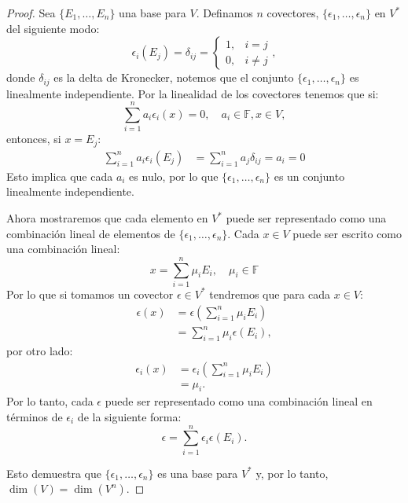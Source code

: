 \begin{proof}
	Sea $\{E_1, \dots, E_n\}$ una base para $V$. Definamos $n$ covectores, $\{\epsilon_1, \dots, \epsilon_n\}$ en $V^{*}$ del siguiente modo:
	\[
		\epsilon_i(E_j) = \delta_{ij} = \begin{cases}
			1, & i = j    \\
			0, & i \neq j
		\end{cases},
	\]
	donde $\delta_{ij}$ es la delta de Kronecker, notemos que el conjunto $\{\epsilon_1, \dots, \epsilon_n\}$ es linealmente independiente. Por la linealidad de los covectores tenemos que si:
	\[
		\sum_{i=1}^{n} a_i \epsilon_i(x) = 0, \quad a_{i} \in \mathbb{F}, x \in V,
	\]
	entonces, si $x = E_j$:
	\begin{align*}
		\sum_{i=1}^n a_i \epsilon_i (E_j) & = \sum_{i=1}^n a_j \delta_{ij} = a_i = 0
	\end{align*}
	Esto implica que cada $a_i$ es nulo, por lo que $\{\epsilon_1, \dots, \epsilon_n\}$ es un conjunto linealmente independiente.

	Ahora mostraremos que cada elemento en $V^{*}$ puede ser representado como una combinación lineal de elementos de $\{\epsilon_1, \dots, \epsilon_n\}$. Cada $x \in V$ puede ser escrito como una combinación lineal:
	\[
		x = \sum_{i=1}^{n} \mu_{i} E_i, \quad \mu_i \in \mathbb{F}
	\]
	Por lo que si tomamos un covector $\epsilon \in V^{*}$ tendremos que para cada $x \in V$:
	\begin{align*}
		\epsilon(x) & = \epsilon
		\left (\sum_{i=1}^{n} \mu_i E_i \right)                          \\
		            & = \sum_{i=1}^{n} \mu_i \epsilon \left(E_i \right),
	\end{align*}
	por otro lado:
	\begin{align*}
		\epsilon_i(x) & = \epsilon_i\left(\sum_{i=1}^{n} \mu_i E_i\right) \\
		              & = \mu_i.
	\end{align*}
	Por lo tanto, cada $\epsilon$ puede ser representado como una combinación lineal en términos de $\epsilon_i$ de la siguiente forma:
	\[
		\epsilon = \sum_{i=1}^{n} \epsilon_i \epsilon(E_i).
	\]

	Esto demuestra que $\{\epsilon_1, \dots, \epsilon_n\}$ es una base para $V^{*}$ y, por lo tanto, $\dim(V) = \dim(V^{n})$.
\end{proof}

